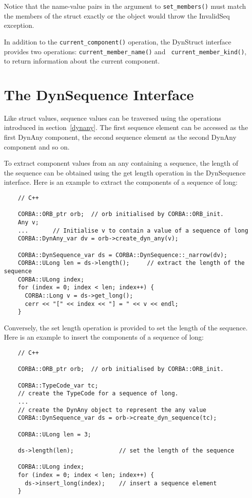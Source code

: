 \documentclass[11pt,twoside,onecolumn]{book}
\begin{document}
Notice that the name-value pairs in the argument to {\tt set\_members()}
must match the members of the struct exactly or the object would throw the
InvalidSeq exception.

In addition to the {\tt current\_component()} operation, the DynStruct
interface provides two operations: {\tt current\_member\_name()} and {\tt
current\_member\_kind()}, to return information about the current
component.

\section{The DynSequence Interface}

Like struct values, sequence values can be traversed using the operations
introduced in section~\ref{dynany}. The first sequence element can be
accessed as the first DynAny component, the second sequence element as the
second DynAny component and so on. 

To extract component values from an any containing a sequence, the length
of the sequence can be obtained using the get length operation in the
DynSequence interface. Here is an example to extract the components of a
sequence of long:

{\small
\begin{verbatim}
    // C++
    
    CORBA::ORB_ptr orb;  // orb initialised by CORBA::ORB_init.
    Any v;
    ...       // Initialise v to contain a value of a sequence of long
    CORBA::DynAny_var dv = orb->create_dyn_any(v);
    
    CORBA::DynSequence_var ds = CORBA::DynSequence::_narrow(dv);
    CORBA::ULong len = ds->length();     // extract the length of the sequence
    CORBA::ULong index;
    for (index = 0; index < len; index++) {
      CORBA::Long v = ds->get_long();
      cerr << "[" << index << "] = " << v << endl;
    }
\end{verbatim}
}

Conversely, the set length operation is provided to set the length of the
sequence. Here is an example to insert the components of a sequence of
long:

{\small
\begin{verbatim}
    // C++
    
    CORBA::ORB_ptr orb;  // orb initialised by CORBA::ORB_init.
    
    CORBA::TypeCode_var tc;
    // create the TypeCode for a sequence of long.
    ...
    // create the DynAny object to represent the any value
    CORBA::DynSequence_var ds = orb->create_dyn_sequence(tc);
    
    CORBA::ULong len = 3;
    
    ds->length(len);             // set the length of the sequence
    
    CORBA::ULong index;
    for (index = 0; index < len; index++) {
      ds->insert_long(index);    // insert a sequence element
    }
\end{verbatim}
}
\end{document}

